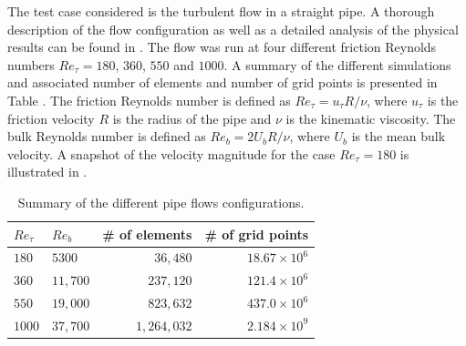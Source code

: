\documentclass{sig-alternate}
\begin{document}
The test case considered is the turbulent flow in a straight pipe. A thorough description of the flow configuration as well as a detailed analysis of the physical results can be found in \cite{Khoury2013}. The flow was run at four different friction Reynolds numbers $Re_{\tau} = 180$, $360$, $550$ and $1000$. A summary of the different simulations and associated number of elements and number of grid points is presented in Table . The friction Reynolds number is defined as $Re_{\tau} = u_{\tau} R / \nu$, where $u_{\tau}$ is the friction velocity $R$ is the radius of the pipe and  $\nu$ is the kinematic viscosity. The bulk Reynolds number is defined as $Re_{b} = 2 U_b R / \nu$, where $U_b$ is the mean bulk velocity. A snapshot of the velocity magnitude for the case $Re_{\tau} = 180$ is illustrated in .

\begin{table}
\centering
\caption{Summary of the different pipe flows configurations.}
\begin{tabular}{llrr} 
\hline
$Re_{\tau}$&$Re_{b}$&\# of elements & \# of grid points\\ 
\hline
$180$ & $5300$ & $36,480$ & $18.67 \times 10^6$\\
$360$ & $11,700$ & $237,120$ & $121.4 \times 10^6$\\ 
$550$ & $19,000$ & $823,632$ & $437.0 \times 10^6$\\ 
$1000$ & $37,700$ & $1,264,032$ & $2.184 \times 10^9$\\
\hline
\end{tabular}
\label{tab:pipe_conf}
\end{table}
\end{document}
